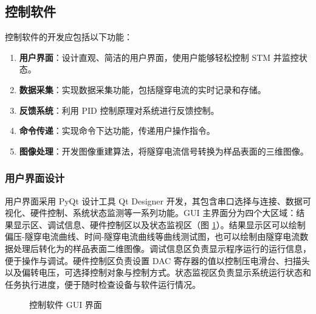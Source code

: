 \documentclass{article}
\begin{document}
\subsection{控制软件}
控制软件的开发应包括以下功能：
\begin{enumerate}
	\item \textbf{用户界面}：设计直观、简洁的用户界面，使用户能够轻松控制 STM 并监控状态。
	\item \textbf{数据采集}：实现数据采集功能，包括隧穿电流的实时记录和存储。
	\item \textbf{反馈系统}：利用 PID 控制原理对系统进行反馈控制。
	\item \textbf{命令传递}：实现命令下达功能，传递用户操作指令。
	\item \textbf{图像处理}：开发图像重建算法，将隧穿电流信号转换为样品表面的三维图像。
\end{enumerate}

\subsubsection{用户界面设计}
用户界面采用 PyQt 设计工具 Qt Designer 开发，其包含串口选择与连接、数据可视化、硬件控制、系统状态监测等一系列功能。GUI 主界面分为四个大区域：结果显示区、调试信息、硬件控制区以及状态监视区（图 \ref{fig19}）。结果显示区可以绘制偏压-隧穿电流曲线、时间-隧穿电流曲线等曲线测试图，也可以绘制由隧穿电流数据处理后转化为的样品表面二维图像。调试信息区负责显示程序运行的运行信息，便于操作与调试。硬件控制区负责设置 DAC 寄存器的值以控制压电滑台、扫描头以及偏转电压，可选择控制对象与控制方式。状态监视区负责显示系统运行状态和任务执行进度，便于随时检查设备与软件运行情况。

\begin{figure}[!h]
	\centering
	\caption{控制软件 GUI 界面}
	\label{fig19}
\end{figure}
\end{document}
